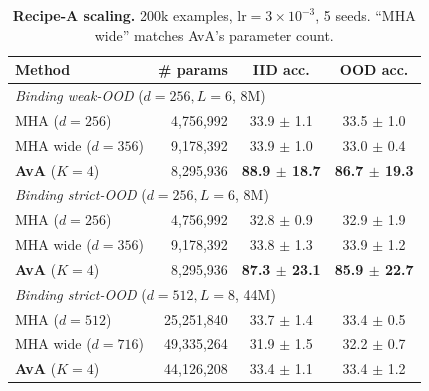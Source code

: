 \documentclass{article}
\begin{document}
\begin{table}[h]
\centering
\caption{\textbf{Recipe-A scaling.} 200k examples,
$\mathrm{lr}{=}3\!\times\!10^{-3}$, 5 seeds. ``MHA wide'' matches
AvA's parameter count.}
\label{tab:scaling-A}
\begin{tabular}{lrcc}
\toprule
Method & \# params & IID acc. & OOD acc. \\
\midrule
\multicolumn{4}{l}{\textit{Binding weak-OOD} ($d{=}256, L{=}6$, 8M)} \\
\hspace{1em} MHA ($d{=}256$)            & 4,756,992 & 33.9 $\pm$ 1.1 & 33.5 $\pm$ 1.0 \\
\hspace{1em} MHA wide ($d{=}356$)       & 9,178,392 & 33.9 $\pm$ 1.0 & 33.0 $\pm$ 0.4 \\
\hspace{1em} \textbf{AvA} ($K{=}4$)     & 8,295,936 & \textbf{88.9 $\pm$ 18.7} & \textbf{86.7 $\pm$ 19.3} \\
\midrule
\multicolumn{4}{l}{\textit{Binding strict-OOD} ($d{=}256, L{=}6$, 8M)} \\
\hspace{1em} MHA ($d{=}256$)            & 4,756,992 & 32.8 $\pm$ 0.9 & 32.9 $\pm$ 1.9 \\
\hspace{1em} MHA wide ($d{=}356$)       & 9,178,392 & 33.8 $\pm$ 1.3 & 33.9 $\pm$ 1.2 \\
\hspace{1em} \textbf{AvA} ($K{=}4$)     & 8,295,936 & \textbf{87.3 $\pm$ 23.1} & \textbf{85.9 $\pm$ 22.7} \\
\midrule
\multicolumn{4}{l}{\textit{Binding strict-OOD} ($d{=}512, L{=}8$, 44M)} \\
\hspace{1em} MHA ($d{=}512$)            & 25,251,840 & 33.7 $\pm$ 1.4 & 33.4 $\pm$ 0.5 \\
\hspace{1em} MHA wide ($d{=}716$)       & 49,335,264 & 31.9 $\pm$ 1.5 & 32.2 $\pm$ 0.7 \\
\hspace{1em} \textbf{AvA} ($K{=}4$)     & 44,126,208 & 33.4 $\pm$ 1.1 & 33.4 $\pm$ 1.2 \\
\bottomrule
\end{tabular}
\end{table}
\end{document}
